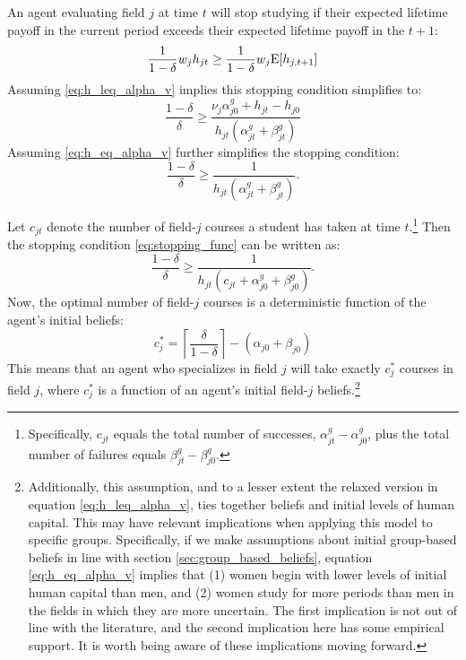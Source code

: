 \documentclass[11 pt]{article}
\newcommand{\toedit}[1]{{\color{gray}#1}}
\newcommand{\toedit}[1]{#1}
\newcommand{\study}{m} %
\begin{document}
\toedit{
An agent evaluating field $j$ at time $t$ will stop studying if their expected lifetime payoff in the current period exceeds their expected lifetime payoff in the $t+1$:
\begin{equation*}
    \frac{1}{1 - \delta} w_j h_{jt} 
    \geq 
    \frac{1}{1 - \delta} w_j \text{E} [h_{j,t+1}]
\end{equation*}
Assuming \eqref{eq:h_leq_alpha_v} implies this stopping condition simplifies to:
\begin{equation*}
    \frac{1 - \delta}{\delta} \geq 
    \frac{
        \nu_j \alpha_{j0}^g + h_{jt} - h_{j0}
    }{
        h_{jt} (\alpha_{jt}^g + \beta_{jt}^g)
    }
\end{equation*}
Assuming \eqref{eq:h_eq_alpha_v} further simplifies the stopping condition:
\begin{equation}\label{eq:stopping_func}
    \frac{1 - \delta}{\delta} \geq 
    \frac{
        1
    }{
        h_{jt} (\alpha_{jt}^g + \beta_{jt}^g)
    }.
\end{equation}

Let $c_{jt}$ denote the number of field-$j$ courses a student has taken at time $t$.\footnote{
    Specifically, $c_{jt}$ equals the total number of successes, $\alpha_{jt}^g - \alpha_{j0}^g$, plus the total number of failures equals $\beta_{jt}^g - \beta_{j0}^g$.
}
Then the stopping condition \eqref{eq:stopping_func} can be written as:
\begin{equation*}
    \frac{1 - \delta}{\delta} \geq 
    \frac{
        1
    }{
        h_{jt} (c_{jt} + \alpha_{j0}^g + \beta_{j0}^g)
    }.
\end{equation*}
Now, the optimal number of field-$j$ courses is a deterministic function of the agent's initial beliefs:
\begin{equation*}
     c_j^* = \left\lceil \frac{\delta}{1 - \delta} \right\rceil - (\alpha_{j0} + \beta_{j0})
\end{equation*}
This means that an agent who specializes in field $j$ will take exactly $c_{j}^*$ courses in field $j$, where $c_{j}^*$ is a function of an agent's initial field-$j$ beliefs.\footnote{
    \toedit{Additionally, this assumption, and to a lesser extent the relaxed version in equation \eqref{eq:h_leq_alpha_v}, ties together beliefs and initial levels of human capital. 
    This may have relevant implications when applying this model to specific groups. 
    Specifically, if we make assumptions about initial group-based beliefs in line with section \ref{sec:group_based_beliefs}, equation \eqref{eq:h_eq_alpha_v} implies that (1) women begin with lower levels of initial human capital than men, and (2) women study for more periods than men in the fields in which they are more uncertain. \toedit{The first implication is not out of line with the literature, and the second implication here has some empirical support.} It is worth being aware of these implications moving forward.}
}

}
\end{document}
